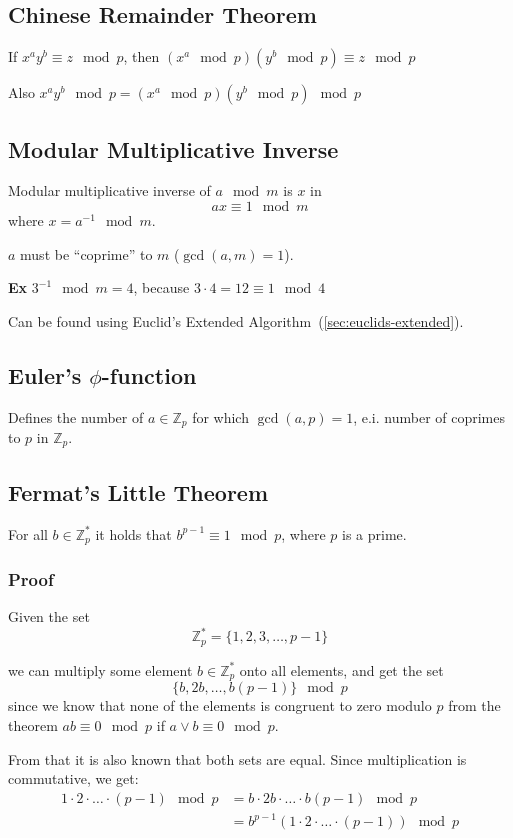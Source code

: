 \subsection{Chinese Remainder Theorem}
\label{sec:crm}
If $x^ay^b \equiv z \mod p$, then $(x^a \mod p)(y^b \mod p) \equiv z \mod p$

Also $x^ay^b \mod p = (x^a \mod p)(y^b \mod p) \mod p$

\subsection{Modular Multiplicative Inverse}
\label{sec:modular-mult-inverse}
Modular multiplicative inverse of $a \mod m$ is $x$ in
\[ ax \equiv 1 \mod m \]
where $x = a^{-1} \mod m$.

$a$ must be ``coprime'' to $m$ ($\gcd(a, m) = 1$).

\textbf{Ex} $3^{-1} \mod m = 4$, because $3 \cdot 4 = 12 \equiv 1 \mod 4$

Can be found using Euclid's Extended Algorithm~(\ref{sec:euclids-extended}).

\subsection{Euler's $\phi$-function}
\label{sec:eulers-phi}
Defines the number of $a \in \mathbb{Z}_p$ for which $\gcd(a, p) = 1$,
e.i. number of coprimes to $p$ in $\mathbb{Z}_p$.

\subsection{Fermat's Little Theorem}
\label{sec:fermats-little}
For all $b \in \mathbb{Z}_p^*$ it holds that $b^{p-1} \equiv 1 \mod
p$, where $p$ is a prime.

\subsubsection*{Proof}
Given the set
\[ \mathbb{Z}_p^* = \{1,2,3,\ldots,p-1\} \]

we can multiply some element $b \in \mathbb{Z}_p^*$ onto all elements,
and get the set
\[ \{b,2b,\ldots,b(p-1)\} \mod p \]
since we know that none of the elements is congruent to zero modulo
$p$ from the theorem $ab \equiv 0 \mod p$ if $a \lor b \equiv 0 \mod
p$.

From that it is also known that both sets are equal. Since
multiplication is commutative, we get:
\begin{align*}
  1 \cdot 2 \cdot \ldots \cdot (p - 1) \mod p &= b \cdot 2b \cdot \ldots
  \cdot b(p-1) \mod p\\
  &= b^{p-1}(1\cdot 2 \cdot \ldots \cdot (p - 1)) \mod p
\end{align*}

